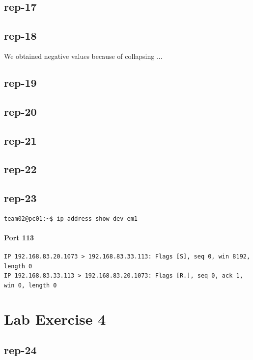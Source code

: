 \documentclass{article}
\begin{document}
\subsection{rep-17}
\subsection{rep-18}

We obtained negative values because of collapsing ...

\subsection{rep-19}

\subsection{rep-20}

\subsection{rep-21}
\subsection{rep-22}
\subsection{rep-23}

\begin{lstlisting}[label=listing:ip-command,caption={Command used to obtain IP address}]
team02@pc01:~$ ip address show dev em1
\end{lstlisting}

\paragraph{Port 113}
\begin{Verbatim}
IP 192.168.83.20.1073 > 192.168.83.33.113: Flags [S], seq 0, win 8192, length 0
IP 192.168.83.33.113 > 192.168.83.20.1073: Flags [R.], seq 0, ack 1, win 0, length 0
\end{Verbatim}

\section{Lab Exercise 4}

\subsection{rep-24}
\end{document}
